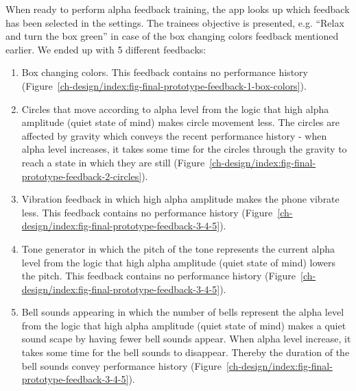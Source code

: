 \documentclass[a4paper,10pt,english,lof,lot,twoside]{puthesis}
\begin{document}
When ready to perform alpha feedback training, the app looks up which feedback
has been selected in the settings. The trainees objective is presented,
e.g. ``Relax and turn the box green'' in case of the box changing colors feedback
mentioned earlier. We ended up with 5 different feedbacks:
\begin{enumerate}
\item {} 
Box changing colors. This feedback contains no performance history (Figure \ref{ch-design/index:fig-final-prototype-feedback-1-box-colors}).

\item {} 
Circles that move according to alpha level from the logic that high alpha
amplitude (quiet state of mind) makes circle movement less. The circles are
affected by gravity which conveys the recent performance history - when alpha
level increases, it takes some time for the circles through the gravity to
reach a state in which they are still (Figure \ref{ch-design/index:fig-final-prototype-feedback-2-circles}).

\item {} 
Vibration feedback in which high alpha amplitude makes the phone vibrate
less. This feedback contains no performance history (Figure \ref{ch-design/index:fig-final-prototype-feedback-3-4-5}).

\item {} 
Tone generator in which the pitch of the tone represents the current alpha
level from the logic that high alpha amplitude (quiet state of mind) lowers
the pitch. This feedback contains no performance history (Figure \ref{ch-design/index:fig-final-prototype-feedback-3-4-5}).

\item {} 
Bell sounds appearing in which the number of bells represent the alpha level
from the logic that high alpha amplitude (quiet state of mind) makes a quiet
sound scape by having fewer bell sounds appear. When alpha level increase, it
takes some time for the bell sounds to disappear. Thereby the duration of the
bell sounds convey performance history (Figure \ref{ch-design/index:fig-final-prototype-feedback-3-4-5}).

\end{enumerate}
\end{document}
